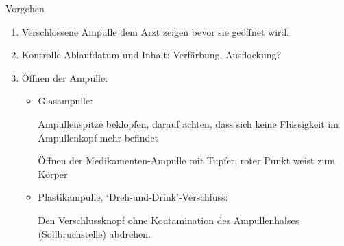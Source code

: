 \documentclass[
ngerman,
paper=a4,
asymmetric,
fontsize=10pt,
draft=false,
numbers=noenddot,
bibtotocnumbered,
footnotes=multiple,
]{scrreprt}
\begin{document}
 \begin{ProcedureStepsWide}{Vorgehen}
 \begin{enumerate}\CorrectionItemizeBox
  \item Verschlossene Ampulle
  dem Arzt zeigen bevor sie geöffnet wird.
  \item Kontrolle Ablaufdatum und Inhalt: Verfärbung,
   Ausflockung?
  \item Öffnen der Ampulle:
   \begin{itemize}
     \item  Glasampulle:
 
     Ampullenspitze beklopfen, darauf achten, dass sich
     keine Flüssigkeit im Ampullenkopf mehr befindet
 
     Öffnen der Medikamenten-Ampulle mit Tupfer, roter Punkt
 weist zum Körper
 
    \item Plastikampulle,
     \enquote*{Dreh-und-Drink}-Verschluss:

     Den Verschlussknopf ohne Kontamination des
    Ampullenhalses (Sollbruchstelle) abdrehen.
 

\end{itemize}
\end{enumerate}
\end{ProcedureStepsWide}
\end{document}
